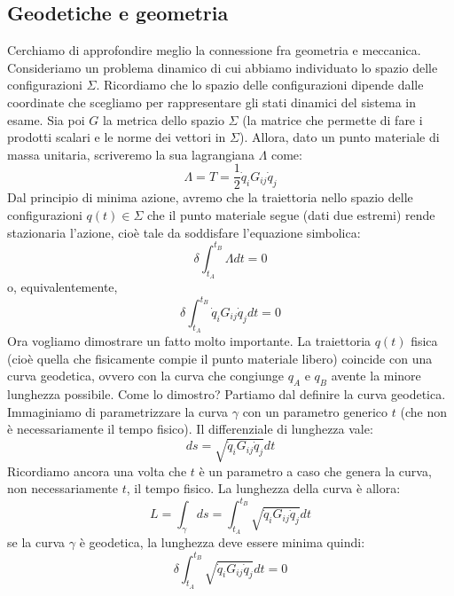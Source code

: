 \documentclass[a4paper,openany]{article}
\begin{document}
	\subsection{Geodetiche e geometria}
	Cerchiamo di approfondire meglio la connessione fra geometria e meccanica. Consideriamo un problema dinamico di cui abbiamo individuato lo spazio delle configurazioni $\Sigma$. Ricordiamo che lo spazio delle configurazioni dipende dalle coordinate che scegliamo per rappresentare gli stati dinamici del sistema in esame. Sia poi $G$ la metrica dello spazio $\Sigma$ (la matrice che permette di fare i prodotti scalari e le norme dei vettori in $\Sigma$). Allora, dato un punto materiale di massa unitaria, scriveremo la sua lagrangiana $\Lambda$ come:
	\begin{equation}\label{key}
		\Lambda = T = \dfrac{1}{2}\dot{q}_iG_{ij}\dot{q}_j
	\end{equation}
	Dal principio di minima azione, avremo che la traiettoria nello spazio delle configurazioni $q(t)\in\Sigma$ che il punto materiale segue (dati due estremi) rende stazionaria l'azione, cioè tale da soddisfare l'equazione simbolica:
	\begin{equation}\label{key}
		\delta \int_{t_A}^{t_B}\Lambda dt = 0
	\end{equation}
	o, equivalentemente,
	\begin{equation}
		\delta \int_{t_A}^{t_B}\dot{q}_iG_{ij}\dot{q}_j dt = 0
		\label{PrincipioMinimaAzione}
	\end{equation}
	Ora vogliamo dimostrare un fatto molto importante. La traiettoria $q(t)$ fisica (cioè quella che fisicamente compie il punto materiale libero) coincide con una curva geodetica, ovvero con la curva che congiunge $q_A \mbox{ e } q_B$ avente la minore lunghezza possibile. Come lo dimostro? Partiamo dal definire la curva geodetica. Immaginiamo di parametrizzare la curva $\gamma$ con un parametro generico $t$ (che non è necessariamente il tempo fisico). Il differenziale di lunghezza vale:
	$$
	ds = \sqrt{\dot{q}_iG_{ij}\dot{q}_j}dt
	$$
	Ricordiamo ancora una volta che $t$ è un parametro a caso che genera la curva, non necessariamente $t$, il tempo fisico. La lunghezza della curva è allora:
	$$
	L = \int_{\gamma} ds = \int_{t_A}^{t_B}\sqrt{\dot{q}_iG_{ij}\dot{q}_j}dt 
	$$ 
	se la curva $\gamma$ è geodetica, la lunghezza deve essere minima quindi:
	\begin{equation}
		\delta \int_{t_A}^{t_B}\sqrt{\dot{q}_iG_{ij}\dot{q}_j}dt  = 0
		\label{Geod}
	\end{equation}
\end{document}
